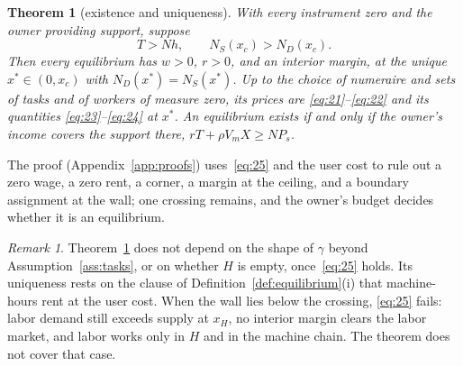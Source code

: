 \documentclass[12pt]{article}
\theoremstyle{plain}
\newtheorem{theorem}{Theorem}
\theoremstyle{definition}
\theoremstyle{remark}
\newtheorem*{remark}{Remark}
\begin{document}
\begin{theorem}[existence and uniqueness]\label{thm:1}
With every instrument zero and the owner providing support, suppose
\begin{equation}\label{eq:25}
T>Nh,\qquad
N_S(x_c)>N_D(x_c).
\end{equation}
Then every equilibrium has $w>0$, $r>0$, and an interior margin, at the unique $x^*\in(0,x_c)$ with $N_D(x^*)=N_S(x^*)$. Up to the choice of numeraire and sets of tasks and of workers of measure zero, its prices are \eqref{eq:21}--\eqref{eq:22} and its quantities \eqref{eq:23}--\eqref{eq:24} at $x^*$. An equilibrium exists if and only if the owner's income covers the support there, $rT+\rho V_mX\ge NP_s$.
\end{theorem}

The proof (Appendix~\ref{app:proofs}) uses~\eqref{eq:25} and the user cost to rule out a zero wage, a zero rent, a corner, a margin at the ceiling, and a boundary assignment at the wall; one crossing remains, and the owner's budget decides whether it is an equilibrium.

\begin{remark}
Theorem~\ref{thm:1} does not depend on the shape of $\gamma$ beyond Assumption~\ref{ass:tasks}, or on whether $H$ is empty, once~\eqref{eq:25} holds. Its uniqueness rests on the clause of Definition~\ref{def:equilibrium}(i) that machine-hours rent at the user cost. When the wall lies below the crossing, \eqref{eq:25} fails: labor demand still exceeds supply at $x_H$, no interior margin clears the labor market, and labor works only in $H$ and in the machine chain. The theorem does not cover that case.
\end{remark}
\end{document}
